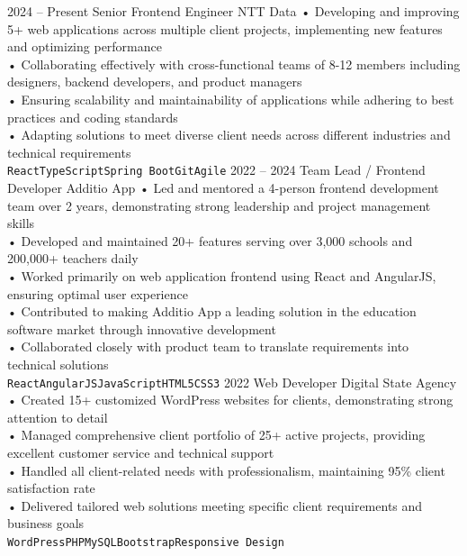 \documentclass[9pt]{developercv} %
\begin{document}
\begin{entrylist}
	\entry
		{2024 -- Present}
		{Senior Frontend Engineer}
		{NTT Data}
		{• Developing and improving 5+ web applications across multiple client projects, implementing new features and optimizing performance\\
		• Collaborating effectively with cross-functional teams of 8-12 members including designers, backend developers, and product managers\\
		• Ensuring scalability and maintainability of applications while adhering to best practices and coding standards\\
		• Adapting solutions to meet diverse client needs across different industries and technical requirements\\ \texttt{React}\slashsep\texttt{TypeScript}\slashsep\texttt{Spring Boot}\slashsep\texttt{Git}\slashsep\texttt{Agile}}
	\entry
		{2022 -- 2024}
		{Team Lead / Frontend Developer}
		{Additio App}
		{• Led and mentored a 4-person frontend development team over 2 years, demonstrating strong leadership and project management skills\\
		• Developed and maintained 20+ features serving over 3,000 schools and 200,000+ teachers daily\\
		• Worked primarily on web application frontend using React and AngularJS, ensuring optimal user experience\\
		• Contributed to making Additio App a leading solution in the education software market through innovative development\\
		• Collaborated closely with product team to translate requirements into technical solutions\\ \texttt{React}\slashsep\texttt{AngularJS}\slashsep\texttt{JavaScript}\slashsep\texttt{HTML5}\slashsep\texttt{CSS3}}
	\entry
		{2022}
		{Web Developer}
		{Digital State Agency}
		{• Created 15+ customized WordPress websites for clients, demonstrating strong attention to detail\\
		• Managed comprehensive client portfolio of 25+ active projects, providing excellent customer service and technical support\\
		• Handled all client-related needs with professionalism, maintaining 95\% client satisfaction rate\\
		• Delivered tailored web solutions meeting specific client requirements and business goals\\ \texttt{WordPress}\slashsep\texttt{PHP}\slashsep\texttt{MySQL}\slashsep\texttt{Bootstrap}\slashsep\texttt{Responsive Design}}

\end{entrylist}
\end{document}
